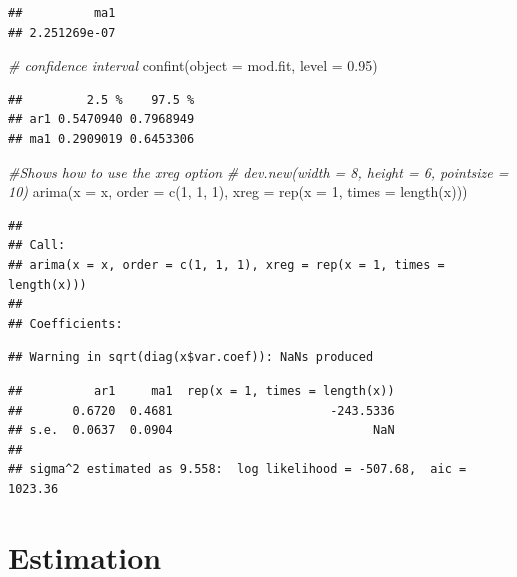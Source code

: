 \documentclass[
]{book}
\newenvironment{Shaded}{\begin{snugshade}}{\end{snugshade}}
\newcommand{\AttributeTok}[1]{\textcolor[rgb]{0.77,0.63,0.00}{#1}}
\newcommand{\CommentTok}[1]{\textcolor[rgb]{0.56,0.35,0.01}{\textit{#1}}}
\newcommand{\DecValTok}[1]{\textcolor[rgb]{0.00,0.00,0.81}{#1}}
\newcommand{\FloatTok}[1]{\textcolor[rgb]{0.00,0.00,0.81}{#1}}
\newcommand{\FunctionTok}[1]{\textcolor[rgb]{0.00,0.00,0.00}{#1}}
\newcommand{\NormalTok}[1]{#1}
\theoremstyle{definition}
\theoremstyle{definition}
\theoremstyle{definition}
\theoremstyle{definition}
\theoremstyle{remark}
\begin{document}
\begin{verbatim}
##          ma1 
## 2.251269e-07
\end{verbatim}

\begin{Shaded}
\begin{Highlighting}[]
  \CommentTok{\# confidence interval}
  \FunctionTok{confint}\NormalTok{(}\AttributeTok{object =}\NormalTok{ mod.fit, }\AttributeTok{level =} \FloatTok{0.95}\NormalTok{)}
\end{Highlighting}
\end{Shaded}

\begin{verbatim}
##         2.5 %    97.5 %
## ar1 0.5470940 0.7968949
## ma1 0.2909019 0.6453306
\end{verbatim}

\begin{Shaded}
\begin{Highlighting}[]
\CommentTok{\#Shows how to use the xreg option}
\CommentTok{\# dev.new(width = 8, height = 6, pointsize = 10)}
\FunctionTok{arima}\NormalTok{(}\AttributeTok{x =}\NormalTok{ x, }\AttributeTok{order =} \FunctionTok{c}\NormalTok{(}\DecValTok{1}\NormalTok{, }\DecValTok{1}\NormalTok{, }\DecValTok{1}\NormalTok{), }\AttributeTok{xreg =} \FunctionTok{rep}\NormalTok{(}\AttributeTok{x =} \DecValTok{1}\NormalTok{, }\AttributeTok{times =} \FunctionTok{length}\NormalTok{(x)))}
\end{Highlighting}
\end{Shaded}

\begin{verbatim}
## 
## Call:
## arima(x = x, order = c(1, 1, 1), xreg = rep(x = 1, times = length(x)))
## 
## Coefficients:
\end{verbatim}

\begin{verbatim}
## Warning in sqrt(diag(x$var.coef)): NaNs produced
\end{verbatim}

\begin{verbatim}
##          ar1     ma1  rep(x = 1, times = length(x))
##       0.6720  0.4681                      -243.5336
## s.e.  0.0637  0.0904                            NaN
## 
## sigma^2 estimated as 9.558:  log likelihood = -507.68,  aic = 1023.36
\end{verbatim}

\hypertarget{estimation}{%
\chapter{Estimation}\label{estimation}}
\end{document}
